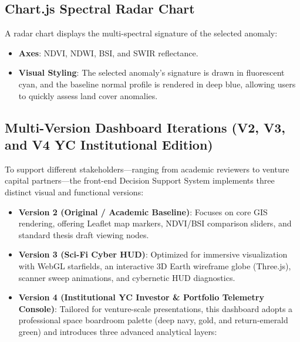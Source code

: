 \subsection{Chart.js Spectral Radar Chart}
A radar chart displays the multi-spectral signature of the selected anomaly:
\begin{itemize}
  \item \textbf{Axes}: NDVI, NDWI, BSI, and SWIR reflectance.
  \item \textbf{Visual Styling}: The selected anomaly's signature is drawn in fluorescent cyan, and the baseline normal profile is rendered in deep blue, allowing users to quickly assess land cover anomalies.

\end{itemize}
\subsection{Multi-Version Dashboard Iterations (V2, V3, and V4 YC Institutional Edition)}
To support different stakeholders—ranging from academic reviewers to venture capital partners—the front-end Decision Support System implements three distinct visual and functional versions:
\begin{itemize}
  \item \textbf{Version 2 (Original / Academic Baseline)}: Focuses on core GIS rendering, offering Leaflet map markers, NDVI/BSI comparison sliders, and standard thesis draft viewing nodes.
  \item \textbf{Version 3 (Sci-Fi Cyber HUD)}: Optimized for immersive visualization with WebGL starfields, an interactive 3D Earth wireframe globe (Three.js), scanner sweep animations, and cybernetic HUD diagnostics.
  \item \textbf{Version 4 (Institutional YC Investor \& Portfolio Telemetry Console)}: Tailored for venture-scale presentations, this dashboard adopts a professional space boardroom palette (deep navy, gold, and return-emerald green) and introduces three advanced analytical layers:
\end{itemize}
